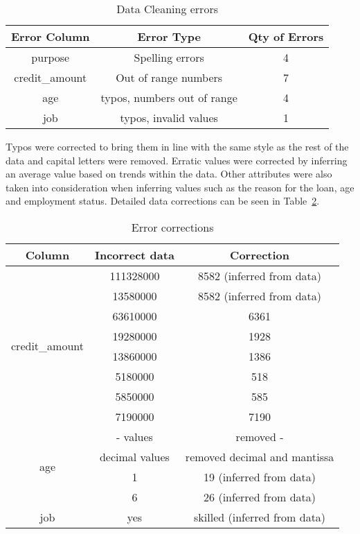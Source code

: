 \documentclass[12pt]{article}
\begin{document}
\begin{table}[h!]
\centering
\begin{tabular}{|c|c|c|}
\hline
\multicolumn{1}{|l|}{Error Column} & Error Type & \multicolumn{1}{r|}{Qty of Errors} \\ \hline
purpose & Spelling errors & 4 \\
credit\_amount & Out of range numbers & 7 \\
age & typos, numbers out of range & 4 \\
job & typos, invalid values & 1 \\ \hline
\end{tabular}
\caption{Data Cleaning errors}
\label{fig:data_cleaning}
\end{table}

Typos were corrected to bring them in line with the same style as the rest of the data and capital letters were removed. Erratic values were corrected by inferring an average value based on trends within the data. Other attributes were also taken into consideration when inferring values such as the reason for the loan, age and employment status. Detailed data corrections can be seen in Table~\ref{fig:error_corrections}.

\begin{table}[]
\centering
\begin{tabular}{|c|c|c|}
\hline
Column & Incorrect data & Correction \\ \hline
\multirow{8}{*}{credit\_amount} & 111328000 & 8582 (inferred from data) \\
 & 13580000 & 8582 (inferred from data) \\
 & 63610000 & 6361 \\
 & 19280000 & 1928 \\
 & 13860000 & 1386 \\
 & 5180000 & 518 \\
 & 5850000 & 585 \\
 & 7190000 & 7190 \\ \hline
\multirow{4}{*}{age} & - values & removed - \\
 & decimal values & removed decimal and mantissa \\
 & 1 & 19 (inferred from data) \\
 & 6 & 26 (inferred from data) \\ \hline
job & yes & skilled (inferred from data) \\ \hline
\end{tabular}
\caption{Error corrections}
\label{fig:error_corrections}
\end{table}
\end{document}
